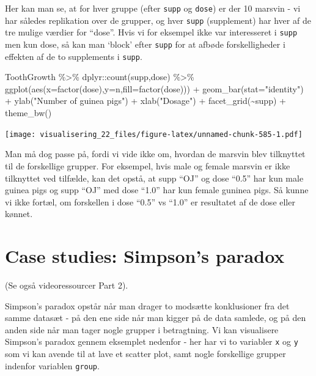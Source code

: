 \documentclass[
]{book}
\newenvironment{Shaded}{\begin{snugshade}}{\end{snugshade}}
\newcommand{\AttributeTok}[1]{\textcolor[rgb]{0.77,0.63,0.00}{#1}}
\newcommand{\FunctionTok}[1]{\textcolor[rgb]{0.00,0.00,0.00}{#1}}
\newcommand{\NormalTok}[1]{#1}
\newcommand{\SpecialCharTok}[1]{\textcolor[rgb]{0.00,0.00,0.00}{#1}}
\newcommand{\StringTok}[1]{\textcolor[rgb]{0.31,0.60,0.02}{#1}}
\begin{document}
Her kan man se, at for hver gruppe (efter \texttt{supp} og \texttt{dose}) er der 10 marsvin - vi har således replikation over de grupper, og hver \texttt{supp} (supplement) har hver af de tre mulige værdier for ``dose''. Hvis vi for eksempel ikke var interesseret i \texttt{supp} men kun dose, så kan man `block' efter \texttt{supp} for at afbøde forskelligheder i effekten af de to supplements i \texttt{supp}.

\begin{Shaded}
\begin{Highlighting}[]
\NormalTok{ToothGrowth }\SpecialCharTok{\%\textgreater{}\%}\NormalTok{ dplyr}\SpecialCharTok{::}\FunctionTok{count}\NormalTok{(supp,dose) }\SpecialCharTok{\%\textgreater{}\%} 
  \FunctionTok{ggplot}\NormalTok{(}\FunctionTok{aes}\NormalTok{(}\AttributeTok{x=}\FunctionTok{factor}\NormalTok{(dose),}\AttributeTok{y=}\NormalTok{n,}\AttributeTok{fill=}\FunctionTok{factor}\NormalTok{(dose))) }\SpecialCharTok{+} 
    \FunctionTok{geom\_bar}\NormalTok{(}\AttributeTok{stat=}\StringTok{"identity"}\NormalTok{) }\SpecialCharTok{+} 
    \FunctionTok{ylab}\NormalTok{(}\StringTok{"Number of guinea pigs"}\NormalTok{) }\SpecialCharTok{+} 
    \FunctionTok{xlab}\NormalTok{(}\StringTok{"Dosage"}\NormalTok{) }\SpecialCharTok{+}
    \FunctionTok{facet\_grid}\NormalTok{(}\SpecialCharTok{\textasciitilde{}}\NormalTok{supp) }\SpecialCharTok{+}
    \FunctionTok{theme\_bw}\NormalTok{()}
\end{Highlighting}
\end{Shaded}

\texttt{[image: visualisering\_22\_files/figure-latex/unnamed-chunk-585-1.pdf]}

Man må dog passe på, fordi vi vide ikke om, hvordan de marsvin blev tilknyttet til de forskellige grupper. For eksempel, hvis male og female marsvin er ikke tilknyttet ved tilfælde, kan det opstå, at supp ``OJ'' og dose ``0.5'' har kun male guinea pigs og supp ``OJ'' med dose ``1.0'' har kun female guninea pigs. Så kunne vi ikke fortæl, om forskellen i dose ``0.5'' vs ``1.0'' er resultatet af de dose eller kønnet.

\hypertarget{case-studies-simpsons-paradox}{%
\section{Case studies: Simpson's paradox}\label{case-studies-simpsons-paradox}}

(Se også videoressourcer Part 2).

Simpson's paradox opstår når man drager to modsætte konklusioner fra det samme datasæt - på den ene side når man kigger på de data samlede, og på den anden side når man tager nogle grupper i betragtning. Vi kan visualisere Simpson's paradox gennem eksemplet nedenfor - her har vi to variabler \texttt{x} og \texttt{y} som vi kan avende til at lave et scatter plot, samt nogle forskellige grupper indenfor variablen \texttt{group}.
\end{document}
